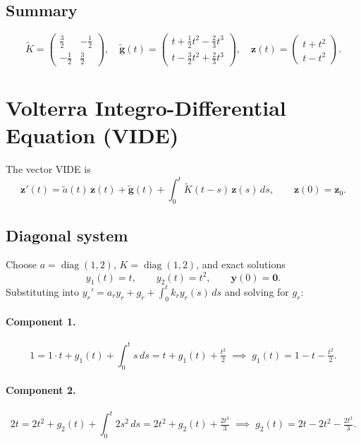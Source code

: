 \documentclass[11pt]{article}
\begin{document}
\subsection*{Summary}
\[
  \boxed{
    \widetilde{K} = \begin{pmatrix}\tfrac{3}{2}&-\tfrac{1}{2}\\-\tfrac{1}{2}&\tfrac{3}{2}\end{pmatrix},
    \quad
    \widetilde{\mathbf{g}}(t) = \begin{pmatrix}t+\tfrac{1}{2}t^2-\tfrac{2}{3}t^3\\[4pt]t-\tfrac{3}{2}t^2+\tfrac{2}{3}t^3\end{pmatrix},
    \quad
    \mathbf{z}(t) = \begin{pmatrix}t+t^2\\t-t^2\end{pmatrix}.
  }
\]

\section{Volterra Integro-Differential Equation (VIDE)}

The vector VIDE is
\[
  \mathbf{z}'(t) = \widetilde{a}(t)\,\mathbf{z}(t)
                 + \widetilde{\mathbf{g}}(t)
                 + \int_0^t \widetilde{K}(t-s)\,\mathbf{z}(s)\,ds,
  \qquad \mathbf{z}(0) = \mathbf{z}_0.
\]

\subsection*{Diagonal system}

Choose $a = \operatorname{diag}(1,2)$, $K = \operatorname{diag}(1,2)$, and
exact solutions
\[
  y_1(t) = t, \qquad y_2(t) = t^2, \qquad \mathbf{y}(0) = \mathbf{0}.
\]
Substituting into $y_r' = a_r y_r + g_r + \int_0^t k_r y_r(s)\,ds$ and
solving for $g_r$:

\paragraph{Component 1.}
\[
  1 = 1\cdot t + g_1(t) + \int_0^t s\,ds
    = t + g_1(t) + \tfrac{t^2}{2}
  \;\implies\;
  g_1(t) = 1 - t - \tfrac{t^2}{2}.
\]

\paragraph{Component 2.}
\[
  2t = 2t^2 + g_2(t) + \int_0^t 2s^2\,ds
     = 2t^2 + g_2(t) + \tfrac{2t^3}{3}
  \;\implies\;
  g_2(t) = 2t - 2t^2 - \tfrac{2t^3}{3}.
\]
\end{document}
